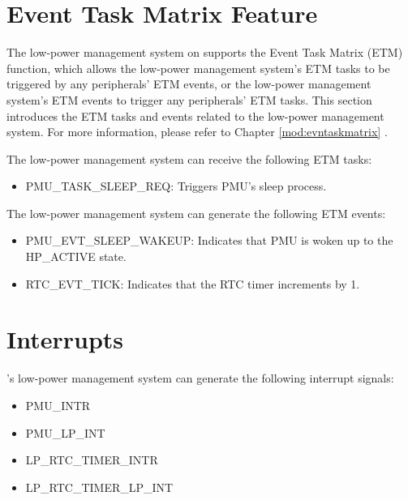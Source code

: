\documentclass[main\_\_EN.tex]{subfiles}
\begin{document}

\section{Event Task Matrix Feature}
\label{sec:lowpowm-etm-func}

The low-power management system on \chipname{} supports the Event Task Matrix (ETM) function, which allows the low-power management system's ETM tasks to be triggered by any peripherals' ETM events, or the low-power management system's ETM events to trigger any peripherals' ETM tasks. This section introduces the ETM tasks and events related to the low-power management system. For more information, please refer to Chapter \ref{mod:evntaskmatrix} .

The low-power management system can receive the following ETM tasks:

\begin{itemize}
\item PMU\_TASK\_SLEEP\_REQ: Triggers PMU's sleep process.
\end{itemize}

The low-power management system can generate the following ETM events:

\begin{itemize}
\item PMU\_EVT\_SLEEP\_WAKEUP: Indicates that PMU is woken up to the HP\_ACTIVE state.
\item RTC\_EVT\_TICK: Indicates that the RTC timer increments by 1.
\end{itemize}


\section{Interrupts}

\chipname{}'s low-power management system can generate the following interrupt signals:

\begin{itemize}
    \item PMU\_INTR
    \item PMU\_LP\_INT
    \item LP\_RTC\_TIMER\_INTR
    \item LP\_RTC\_TIMER\_LP\_INT
\end{itemize}
\end{document}

